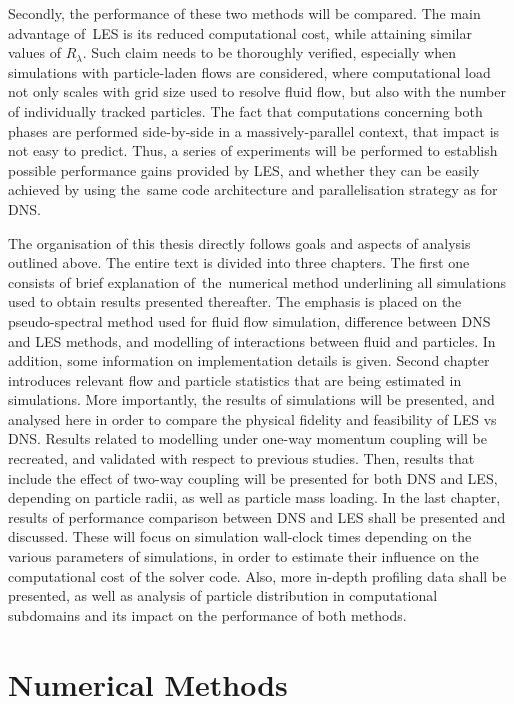 \documentclass{pracamgren}
\begin{document}
Secondly, the performance of these two methods will be compared.
The main advantage of~LES is its reduced computational cost, while attaining similar values of $R_{\lambda}$.
Such claim needs to be thoroughly verified, especially when simulations with particle-laden flows are considered, where computational load not only scales with grid size used to resolve fluid flow, but also with the number of individually tracked particles.
The fact that computations concerning both phases are performed side-by-side in a massively-parallel context, that impact is not easy to predict.
Thus, a series of experiments will be performed to establish possible performance gains provided by LES, and whether they can be easily achieved by using the~same code architecture and parallelisation strategy as for DNS.

The organisation of this thesis directly follows goals and aspects of analysis outlined above.
The entire text is divided into three chapters.
The first one consists of brief explanation of~the~numerical method underlining all simulations used to obtain results presented thereafter.
The emphasis is placed on the pseudo-spectral method used for fluid flow simulation, difference between DNS and LES methods, and modelling of interactions between fluid and particles.
In addition, some information on implementation details is given.
Second chapter introduces relevant flow and particle statistics that are being estimated in simulations.
More importantly, the results of simulations will be presented, and analysed here in order to compare the physical fidelity and feasibility of LES vs DNS.
Results related to modelling under one-way momentum coupling will be recreated, and validated with respect to previous studies.
Then, results that include the effect of two-way coupling will be presented for both DNS and LES, depending on particle radii, as well as particle mass loading.
In the last chapter, results of performance comparison between DNS and LES shall be presented and discussed.
These will focus on simulation wall-clock times depending on the various parameters of simulations, in order to estimate their influence on the computational cost of the solver code.
Also, more in-depth profiling data shall be presented, as well as analysis of particle distribution in computational subdomains and its impact on the performance of both methods.



\chapter{Numerical Methods}
\label{ch:ch1}
\end{document}
